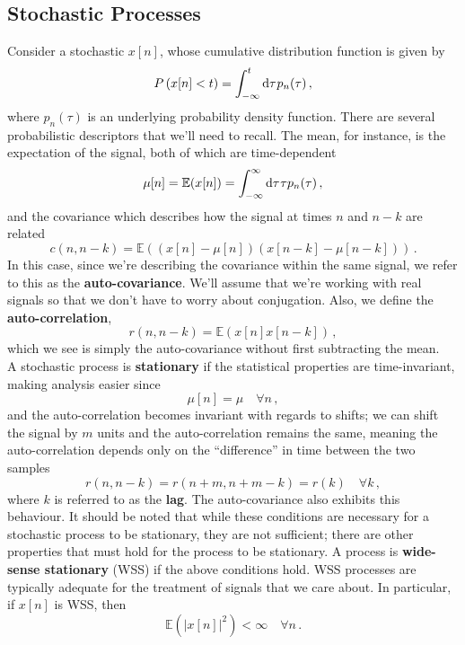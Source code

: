 \subsection{Stochastic Processes}
%
Consider a stochastic $x[n]$, whose cumulative distribution function is
given by
%
\begin{displaymath}
  P\left(x[n] < t\right) = \int_{-\infty}^t\mathrm{d}\tau\mkern1mu p_n(\tau) \,,
\end{displaymath}
%
where $p_n(\tau)$ is an underlying probability density function. There
are several probabilistic descriptors that we'll need to recall. The
mean, for instance, is the expectation of the signal, both of which
are time-dependent
%
\begin{displaymath}
  \mu[n] = \mathbb{E}(x[n]) = \int_{-\infty}^\infty\mathrm{d}\tau\mkern1mu\tau p_n(\tau) \,,
\end{displaymath}
%
and the covariance which describes how the signal at times $n$ and
$n-k$ are related
%
\begin{displaymath}
  c(n,n-k) = \mathbb{E}((x[n]-\mu[n])(x[n-k] - \mu[n-k])) \,.
\end{displaymath}
%
In this case, since we're describing the covariance within the same
signal, we refer to this as the \textbf{auto-covariance}. We'll assume
that we're working with real signals so that we don't have to worry
about conjugation. Also, we define the \textbf{auto-correlation},
%
\begin{displaymath}
  r(n,n-k) = \mathbb{E}(x[n]x[n-k]) \,,
\end{displaymath}
%
which we see is simply the auto-covariance without first subtracting
the mean.\\
%
A stochastic process is \textbf{stationary} if the statistical properties
are time-invariant, making analysis easier since
%
\begin{displaymath}
  \mu[n] = \mu \quad\forall n \,,
\end{displaymath}
%
and the auto-correlation becomes invariant with regards to shifts; we
can shift the signal by $m$ units and the auto-correlation remains the
same, meaning the auto-correlation depends only on the ``difference''
in time between the two samples
%
\begin{displaymath}
  r(n,n-k) = r(n+m,n+m-k) = r(k) \quad\forall k\,,
\end{displaymath}
%
where $k$ is referred to as the \textbf{lag}. The auto-covariance also
exhibits this behaviour. It should be noted that while these conditions
are necessary for a stochastic process to be stationary, they are
not sufficient; there are other properties that must hold for the process
to be stationary. A process is \textbf{wide-sense stationary} (WSS) if
the above conditions hold. WSS processes are typically adequate for
the treatment of signals that we care about. In particular, if $x[n]$
is WSS, then
%
\begin{displaymath}
  \mathbb{E}(\lvert x[n]\rvert^2) < \infty\quad \forall n \,.
\end{displaymath}

